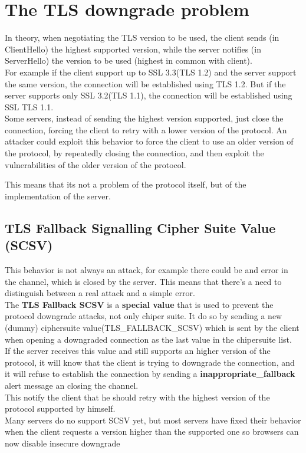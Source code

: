 \section{The TLS downgrade problem}
In theory, when negotiating the TLS version to be used, the client
sends (in ClientHello) the highest supported version, while the server
notifies (in ServerHello) the version to be used (highest in common
with client).\\
For example if the client support up to SSL 3.3(TLS 1.2) and the
server support the same version, the connection will be established
using TLS 1.2. But if the server supports only SSL 3.2(TLS 1.1), the
connection will be established using SSL TLS 1.1.\\
Some servers, instead of sending the highest version supported, just
close the connection, forcing the client to retry with a lower version
of the protocol. An attacker could exploit this behavior to force the
client to use an older version of the protocol, by repeatedly closing
the connection, and then exploit the vulnerabilities of the older
version of the protocol.\\
\begin{boxH}
  This means that its not a problem of the protocol itself, but of the
  implementation of the server.
\end{boxH}

\subsection{TLS Fallback Signalling Cipher Suite Value (SCSV)}
This behavior is not always an attack, for example there could be and
error in the channel, which is closed by the server. This means that
there's a need to distinguish between a real attack and a simple 
error.\\
The \textbf{TLS Fallback SCSV} is a \textbf{special value} that is
used to prevent the protocol downgrade attacks, not only chiper suite.
It do so by sending a new (dummy) ciphersuite
value(TLS\_FALLBACK\_SCSV) which is sent by the client when opening a
downgraded connection as the last value in the chipersuite list.\\
If the server receives this value and still supports an higher version
of the protocol, it will know that the client is trying to downgrade
the connection, and it will refuse to establish the connection by
sending a \textbf{inappropriate\_fallback} alert message an closing
the channel.\\
This notify the client that he should retry with the highest version 
of the protocol supported by himself.\\
Many servers do no support SCSV yet, but most servers have fixed their
behavior when the client requests a version higher than the supported
one so browsers can now disable insecure downgrade

